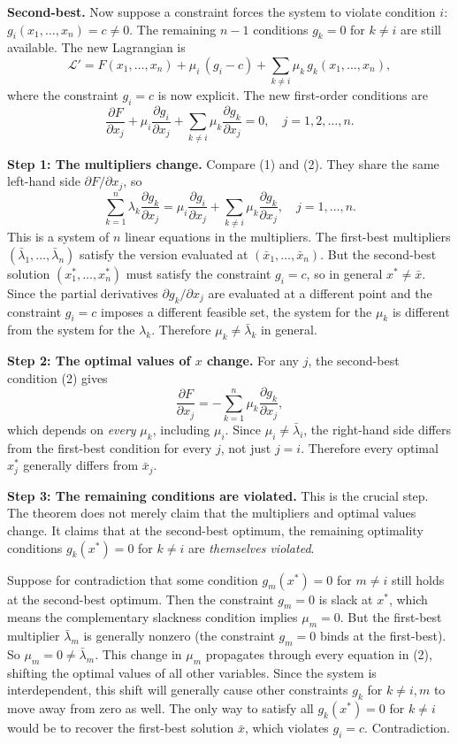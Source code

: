 \documentclass[11pt]{article}
\begin{document}
\textbf{Second-best.} Now suppose a constraint forces the system to violate condition \(i\): \(g_i(x_1, \ldots, x_n) = c \neq 0\). The remaining \(n - 1\) conditions \(g_k = 0\) for \(k \neq i\) are still available. The new Lagrangian is
\[
  \mathcal{L}' = F(x_1, \ldots, x_n) + \mu_i\,(g_i - c) + \sum_{k \neq i} \mu_k \, g_k(x_1, \ldots, x_n),
\]
where the constraint \(g_i = c\) is now explicit. The new first-order conditions are
\[
  \frac{\partial F}{\partial x_j} + \mu_i \frac{\partial g_i}{\partial x_j} + \sum_{k \neq i} \mu_k \frac{\partial g_k}{\partial x_j} = 0, \quad j = 1, 2, \ldots, n. \tag{2}
\]

\textbf{Step 1: The multipliers change.} Compare (1) and (2). They share the same left-hand side \(\partial F / \partial x_j\), so
\[
  \sum_{k=1}^{n} \lambda_k \frac{\partial g_k}{\partial x_j} = \mu_i \frac{\partial g_i}{\partial x_j} + \sum_{k \neq i} \mu_k \frac{\partial g_k}{\partial x_j}, \quad j = 1, \ldots, n.
\]
This is a system of \(n\) linear equations in the multipliers. The first-best multipliers \((\bar{\lambda}_1, \ldots, \bar{\lambda}_n)\) satisfy the version evaluated at \((\bar{x}_1, \ldots, \bar{x}_n)\). But the second-best solution \((x_1^*, \ldots, x_n^*)\) must satisfy the constraint \(g_i = c\), so in general \(x^* \neq \bar{x}\). Since the partial derivatives \(\partial g_k / \partial x_j\) are evaluated at a different point and the constraint \(g_i = c\) imposes a different feasible set, the system for the \(\mu_k\) is different from the system for the \(\lambda_k\). Therefore \(\mu_k \neq \bar{\lambda}_k\) in general.

\textbf{Step 2: The optimal values of \(x\) change.} For any \(j\), the second-best condition (2) gives
\[
  \frac{\partial F}{\partial x_j} = -\sum_{k=1}^{n} \mu_k \frac{\partial g_k}{\partial x_j},
\]
which depends on \textit{every} \(\mu_k\), including \(\mu_i\). Since \(\mu_i \neq \bar{\lambda}_i\), the right-hand side differs from the first-best condition for every \(j\), not just \(j = i\). Therefore every optimal \(x_j^*\) generally differs from \(\bar{x}_j\).

\textbf{Step 3: The remaining conditions are violated.} This is the crucial step. The theorem does not merely claim that the multipliers and optimal values change. It claims that at the second-best optimum, the remaining optimality conditions \(g_k(x^*) = 0\) for \(k \neq i\) are \textit{themselves violated}.

Suppose for contradiction that some condition \(g_m(x^*) = 0\) for \(m \neq i\) still holds at the second-best optimum. Then the constraint \(g_m = 0\) is slack at \(x^*\), which means the complementary slackness condition implies \(\mu_m = 0\). But the first-best multiplier \(\bar{\lambda}_m\) is generally nonzero (the constraint \(g_m = 0\) binds at the first-best). So \(\mu_m = 0 \neq \bar{\lambda}_m\). This change in \(\mu_m\) propagates through every equation in (2), shifting the optimal values of all other variables. Since the system is interdependent, this shift will generally cause other constraints \(g_k\) for \(k \neq i, m\) to move away from zero as well. The only way to satisfy all \(g_k(x^*) = 0\) for \(k \neq i\) would be to recover the first-best solution \(\bar{x}\), which violates \(g_i = c\). Contradiction.
\end{document}
